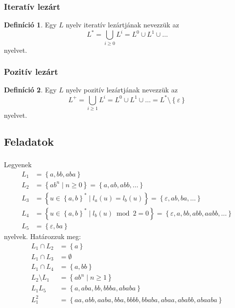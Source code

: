 \documentclass[a4paper,12pt]{article}
\theoremstyle{definition}
\newtheorem*{definition*}{Definíció}
\begin{document}
	\subsubsection{Iteratív lezárt}
	\begin{definition*}
		Egy $L$ nyelv iteratív lezártjának nevezzük az
		\[
		L^* = \bigcup_{i \ge 0}{L^i}=L^0 \cup L^1 \cup \dots
		\]
		nyelvet.
	\end{definition*}

	\subsubsection{Pozitív lezárt}
	\begin{definition*}
		Egy $L$ nyelv pozitív lezártjának nevezzük az
		\[
		L^+ = \bigcup_{i \ge 1}{L^i}=L^0 \cup L^1 \cup \dots = L^* \setminus \left\lbrace \varepsilon \right\rbrace 
		\]
		nyelvet.
	\end{definition*}
	\newpage
	\subsection{Feladatok}
	\subsubsection{}
	Legyenek
	\begin{align*}
		L_1 &= \left\lbrace a, bb, aba \right\rbrace \\
		L_2 &= \left\lbrace ab^n \; | \; n \ge 0 \right\rbrace = \left\lbrace a, ab, abb, \dots \right\rbrace  \\
		L_3 &= \left\lbrace u \in \left\lbrace a,b \right\rbrace ^* \; | \; l_a(u) = l_b(u) \right\rbrace
		     = \left\lbrace \varepsilon, ab, ba, \dots \right\rbrace  \\
		L_4 &= \left\lbrace u \in \left\lbrace a,b \right\rbrace ^* \; | \; l_b(u) \bmod 2  = 0 \right\rbrace
		     = \left\lbrace \varepsilon, a, bb, abb, aabb, \dots \right\rbrace \\
		L_5 &= \left\lbrace \varepsilon, ba \right\rbrace
	\end{align*}
	nyelvek. Határozzuk meg:
	\begin{align*}
		L_1 \cap L_2 &= \left\lbrace a \right\rbrace \\
		L_1 \cap L_3 &= \emptyset \\
		L_1 \cap L_4 &= \left\lbrace a, bb \right\rbrace \\
		L_2 \setminus L_1 &= \left\lbrace ab^n \; | \; n \ge 1 \right\rbrace \\
		L_1L_5 &= \left\lbrace a, aba, bb, bbba, ababa \right\rbrace \\
		L_1^2 &= \left\lbrace aa, abb, aaba, bba, bbbb, bbaba, abaa, ababb, abaaba \right\rbrace 
	\end{align*}
\end{document}
